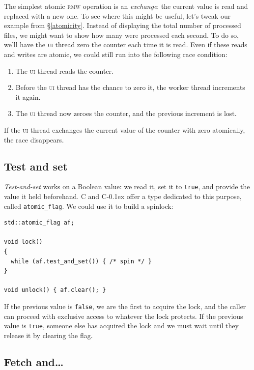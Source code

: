 \documentclass[fontsize=10pt, numbers=endperiod]{scrartcl}
\newcommand{\codesize}{\fontsize{10pt}{12pt}}
\newcommand{\monobox}[1]{\mbox{\texttt{#1}}}
\newcommand{\cpp}[1]{C\kern-0.1ex\raisebox{0.15ex}{\texttt{++}}{\addfontfeature{Numbers=LowercaseOff}#1}}
\newcommand{\introduce}[1]{\textit{#1}}
\newcommand{\secref}[1]{\hyperref[#1]{\textsc{\S}\ref*{#1}}}
\newenvironment{colfigure}
  {\par\vspace{1\baselineskip minus 0.5\baselineskip}\noindent\minipage{\linewidth}}
  {\endminipage\vspace*{1\baselineskip minus 0.7\baselineskip}}
\begin{document}
\begin{multicols*}{2}
The simplest atomic \textsc{rmw} operation is an \introduce{exchange}:
the current value is read and replaced with a new one.
To see where this might be useful,
let's tweak our example from \secref{atomicity}.
Instead of displaying the total number of processed files,
we might want to show how many were processed each second.
To do so, we'll have the \textsc{ui} thread zero the counter each time it
is read.
Even if these reads and writes are atomic,
we could still run into the following race condition:
\begin{enumerate}
\item The \textsc{ui} thread reads the counter.
\item Before the \textsc{ui} thread has the chance to zero it,
    the worker thread increments it again.
\item The \textsc{ui} thread now zeroes the counter, and the previous increment
    is lost.
\end{enumerate}
If the \textsc{ui} thread exchanges the current
value of the counter with zero atomically, the race disappears.

\subsection{Test and set}

\introduce{Test-and-set} works on a Boolean value:
we read it, set it to \texttt{true}, and provide the value it
held beforehand.
C and \cpp{} offer a type dedicated to this purpose, called \monobox{atomic\_flag}.
We could use it to build a spinlock:
\label{spinlock}
\begin{colfigure}
\begin{verbatim}
std::atomic_flag af;

void lock()
{
  while (af.test_and_set()) { /* spin */ }
}

void unlock() { af.clear(); }
\end{verbatim}
\end{colfigure}
If the previous value is \texttt{false},
we are the first to acquire the lock,
and the caller can proceed with exclusive access to whatever the lock protects.
If the previous value is \texttt{true},
someone else has acquired the lock and we must
wait until they release it by clearing the flag.

\subsection{Fetch and…}


\end{multicols*}
\end{document}
